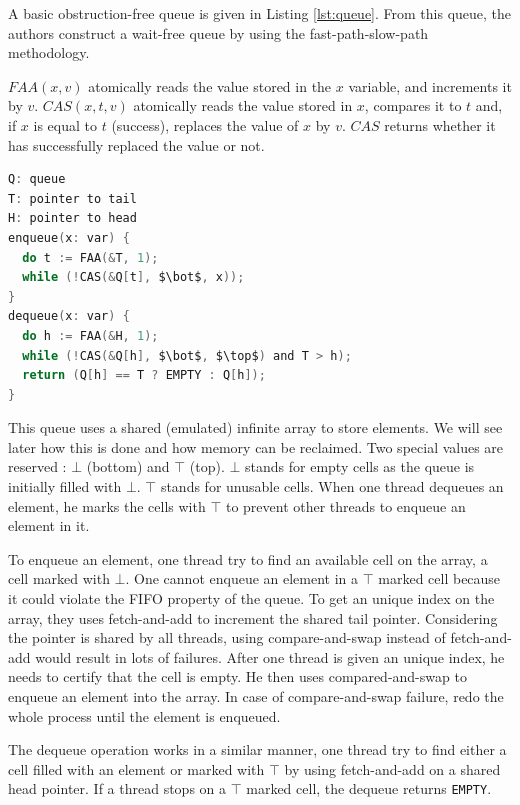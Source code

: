 A basic obstruction-free queue is given in Listing \ref{lst:queue}. From this
queue, the authors construct a wait-free queue by using the fast-path-slow-path
methodology.

$FAA(x, v)$ atomically reads the value stored in the $x$ variable, and
increments it by $v$. $CAS(x, t, v)$ atomically reads the value stored in $x$,
compares it to $t$ and, if $x$ is equal to $t$ (success), replaces the value of
$x$ by $v$. $CAS$ returns whether it has successfully replaced the value or not.

\begin{lstlisting}[mathescape,
                   frame=single,
                   caption={An obstruction-free queue using an infinite array.},
                   label={lst:queue},
                   language=C]
Q: queue
T: pointer to tail
H: pointer to head
enqueue(x: var) {
  do t := FAA(&T, 1);
  while (!CAS(&Q[t], $\bot$, x));
}
dequeue(x: var) {
  do h := FAA(&H, 1);
  while (!CAS(&Q[h], $\bot$, $\top$) and T > h);
  return (Q[h] == T ? EMPTY : Q[h]);
}
\end{lstlisting}

 This queue uses a shared (emulated) infinite array to
store elements. We will see later how this is done and how memory can be
reclaimed. Two special values are reserved : $\bot$ (bottom) and $\top$ (top).
$\bot$ stands for empty cells as the queue is initially filled with $\bot$.
$\top$ stands for unusable cells. When one thread dequeues an element, he marks
the cells with $\top$ to prevent other threads to enqueue an element in it.

To enqueue an element, one thread try to find an available cell on the array, a
cell marked with $\bot$. One cannot enqueue an element in a $\top$ marked cell
because it could violate the FIFO property of the queue. To get an unique index
on the array, they uses fetch-and-add to increment the shared tail pointer.
Considering the pointer is shared by all threads, using compare-and-swap instead
of fetch-and-add would result in lots of failures. After one thread is given an
unique index, he needs to certify that the cell is empty. He then uses
compared-and-swap to enqueue an element into the array. In case of
compare-and-swap failure, redo the whole process until the element is enqueued.

The dequeue operation works in a similar manner, one thread try to find either a
cell filled with an element or marked with $\top$ by using fetch-and-add on a
shared head pointer. If a thread stops on a $\top$ marked cell, the dequeue
returns \texttt{EMPTY}.

